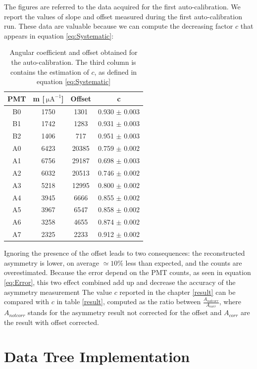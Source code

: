 The figures are referred to the data acquired for the first auto-calibration. We report the values of slope and offset measured during the first auto-calibration run. These data are valuable because we can compute the decreasing factor $c$ that appears in equation \ref{eq:Systematic}:
\begin{table}[h]
\centering
\begin{tabular}{c|c|c|c}
\hline
 PMT & m [$\SI{}{\micro \ampere}^{-1}$] & Offset & c  \\
\hline
 B0  & 1750 &  1301 &  0.930 $\pm$ 0.003\\
 B1  & 1742 &  1283 &  0.931 $\pm$ 0.003\\
 B2  & 1406 &   717 &  0.951 $\pm$ 0.003\\
 A0  & 6423 & 20385 &  0.759 $\pm$ 0.002\\
 A1  & 6756 & 29187 &  0.698 $\pm$ 0.003\\
 A2  & 6032 & 20513 &  0.746 $\pm$ 0.002\\
 A3  & 5218 & 12995 &  0.800 $\pm$ 0.002\\
 A4  & 3945 &  6666 &  0.855 $\pm$ 0.002\\
 A5  & 3967 &  6547 &  0.858 $\pm$ 0.002\\
 A6  & 3258 &  4655 &  0.874 $\pm$ 0.002\\
 A7  & 2325 &  2233 &  0.912 $\pm$ 0.002\\
\hline
\end{tabular}
\caption{Angular coefficient and offset obtained for the auto-calibration. The third column is contains the estimation of $c$, as defined in equation \ref{eq:Systematic}}
\label{table:PMToffset}
\end{table}

Ignoring the presence of the offset leads to two consequences: the reconstructed asymmetry is lower, on average $ \simeq 10\%$ less than expected, and the counts are overestimated. Because the error depend on the PMT counts, as seen in equation \ref{eq:Error}, this two effect combined add up and decrease the accuracy of the asymmetry measurement
The value $c$ reported in the chapter \ref{result} can be compared with $c$ in table \ref{result}, computed as the ratio between $\frac{A_{not corr}}{A_{corr}}$, where $A_{not corr}$ stands for the asymmetry result not corrected for the offset and $A_{corr}$ are the result with offset corrected. 

\section{Data Tree Implementation}

